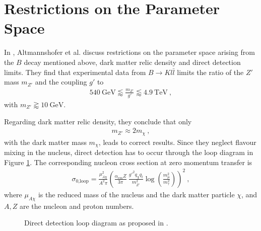 
\section{Restrictions on the Parameter Space\label{sec:ParamSpace}}
In \cite{Z}, Altmannshofer et al. discuss restrictions on the parameter space arising from the $B$ decay mentioned above, dark matter relic density and direct detection limits. They find that experimental data from $B\rightarrow Kl\bar{l}$ limits the ratio of the $Z'$ mass $m_{Z'}$ and the coupling $g'$ to
\begin{align}\label{eq:BoundBS}
	\SI{540}{\giga\electronvolt}\lessapprox\frac{m_{Z'}}{g'}\lessapprox\SI{4.9}{\tera\electronvolt} \ ,
\end{align}
with $m_{Z'}\gtrapprox\SI{10}{\giga\electronvolt}$.



\begin{minipage}{0.67\textwidth}
	Regarding dark matter relic density, they conclude that only
	\begin{align}\label{eq:Relic}
		m_{Z'}\approx 2m_\chi \ ,
	\end{align}
	with the dark matter mass $m_\chi$, leads to correct results. Since they neglect flavour mixing in the nucleus, direct detection has to occur through the loop diagram in Figure \ref{fig:Loop}. The corresponding nucleon cross section at zero momentum transfer is
	\begin{align}\label{eq:Loop}
		\sigma_\text{0,loop} = \frac{\mu_{A\chi}^2}{A^2\pi}\left(\frac{\alpha_{em}Z}{3\pi}\ \frac{g'^2q_\chi q_l}{m_{Z'}^2}\log\left(\frac{m_\mu^2}{m_\tau^2}\right)\right)^2 \ ,
	\end{align}
	where $\mu_{A\chi}$ is the reduced mass of the nucleus and the dark matter particle $\chi$, and $A,Z$ are the nucleon and proton numbers.
\end{minipage} \hfill
\begin{minipage}{0.28\textwidth}
	\begin{figure}[H]
		\centering
		\resizebox{\textwidth}{!}{
				
		}
		\captionsetup{width=\textwidth}
		\caption{Direct detection loop diagram as proposed in \cite{Z}.}
		\label{fig:Loop}
	\end{figure}
\end{minipage}



